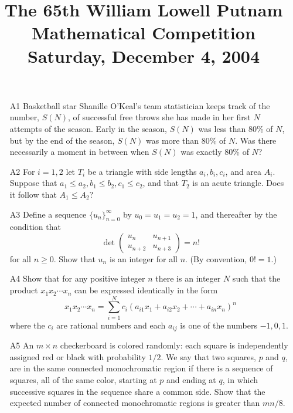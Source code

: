 \documentclass[amssymb,twocolumn,pra,10pt,aps]{revtex4-1}
\begin{document}
\title{The 65th William Lowell Putnam Mathematical Competition \\
    Saturday, December 4, 2004}
\maketitle

\begin{itemize}

\item[A1]
Basketball star Shanille O'Keal's team statistician
keeps track of the number, $S(N)$, of successful free throws she has made
in her first $N$ attempts of the season.
Early in the season, $S(N)$  was less than 80\% of  $N$,
but by the end of the season, $S(N)$ was more than 80\% of $N$.
Was there necessarily a moment in between when $S(N)$ was exactly 80\% of
$N$?

\item[A2]
For $i = 1,2$ let $T_i$ be a triangle with side lengths $a_i, b_i, c_i$,
and area $A_i$.  Suppose that $a_1 \le a_2,  b_1 \le b_2,  c_1 \le
c_2$,
and that $T_2$ is an acute triangle. Does it follow that $A_1
\le A_2$?

\item[A3]
Define a sequence $\{ u_n \}_{n=0}^\infty$
by  $u_0 = u_1 = u_2 = 1$, and thereafter by
the
condition that
\[
\det\begin{pmatrix}
u_n &   u_{n+1}\\
u_{n+2} & u_{n+3}
\end{pmatrix}
= n!
\]
for all $n \ge 0$. Show that $u_n$ is an integer for all $n$.
(By convention, $0! = 1$.)

\item[A4]
Show that for any positive integer $n$ there is an integer $N$ such that
the product $x_1 x_2 \cdots x_n$ can be expressed identically in the form
\[
x_1 x_2 \cdots x_n =
\sum_{i=1}^N  c_i
( a_{i1} x_1 + a_{i2} x_2 + \cdots + a_{in} x_n )^n
\]
where the $c_i$ are rational numbers and each $a_{ij}$ is one of the
numbers $-1, 0, 1$.

\item[A5]
An $m \times n$ checkerboard is colored randomly: each square is
independently
assigned red or black with probability $1/2$. We say that two squares,
$p$ and $q$,  are in the same connected monochromatic region if there is
a sequence of squares, all of the same color, starting at $p$ and ending
at $q$, in which successive squares in the sequence share a common side.
Show that the expected number of connected monochromatic regions is
greater than $m n / 8$.


\end{itemize}
\end{document}
